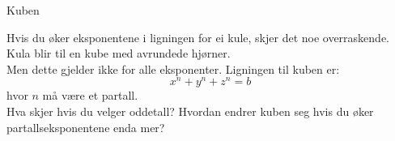 \documentclass[no]{./../../common/SurferDesc}%
\begin{document}
\footnotesize
%

\begin{surferPage}
  \begin{surferTitle}Kuben\end{surferTitle}
   \begin{surferText}
   
Hvis du øker eksponentene i ligningen for ei kule, skjer det noe overraskende. Kula blir til en kube med avrundede hjørner.\\
\vspace{0.3cm}
Men dette gjelder ikke for alle eksponenter. Ligningen til kuben er:
\[x^n+y^n+z^n=b\]
hvor $n$ må være et partall.\\
\vspace{0.3cm}
Hva skjer hvis du velger oddetall? Hvordan endrer kuben seg hvis du øker partallseksponentene enda mer? 
     \end{surferText}
\end{surferPage}
\end{document}
